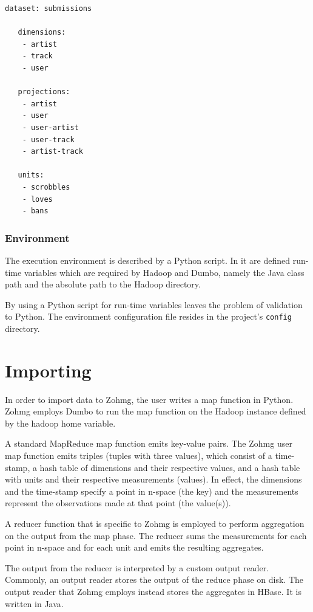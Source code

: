 \begin{lstlisting}[caption=A data set configuration example.,captionpos=b]
   dataset: submissions

   dimensions:
    - artist
    - track
    - user

   projections:
    - artist
    - user
    - user-artist
    - user-track
    - artist-track

   units:
    - scrobbles
    - loves
    - bans
\end{lstlisting}


\subsubsection*{Environment}

The execution environment is described by a Python script. In it are defined
run-time variables which are required by Hadoop and Dumbo, namely the Java class
path and the absolute path to the Hadoop directory.

By using a Python script for run-time variables leaves the problem of validation
to Python. The environment configuration file resides in the project's
\texttt{config} directory.


\section{Importing}

In order to import data to Zohmg, the user writes a map function in Python.
Zohmg employs Dumbo to run the map function on the Hadoop instance defined by
the hadoop home variable.

A standard MapReduce map function emits key-value pairs. The Zohmg user map
function emits triples (tuples with three values), which consist of a
time-stamp, a hash table of dimensions and their respective values, and a hash
table with units and their respective measurements (values). In effect, the
dimensions and the time-stamp specify a point in n-space (the key) and the
measurements represent the observations made at that point (the value(s)).

A reducer function that is specific to Zohmg is employed to perform aggregation
on the output from the map phase. The reducer sums the measurements for each
point in n-space and for each unit and emits the resulting aggregates.

The output from the reducer is interpreted by a custom output reader. Commonly,
an output reader stores the output of the reduce phase on disk. The output
reader that Zohmg employs instead stores the aggregates in HBase. It is written
in Java.

